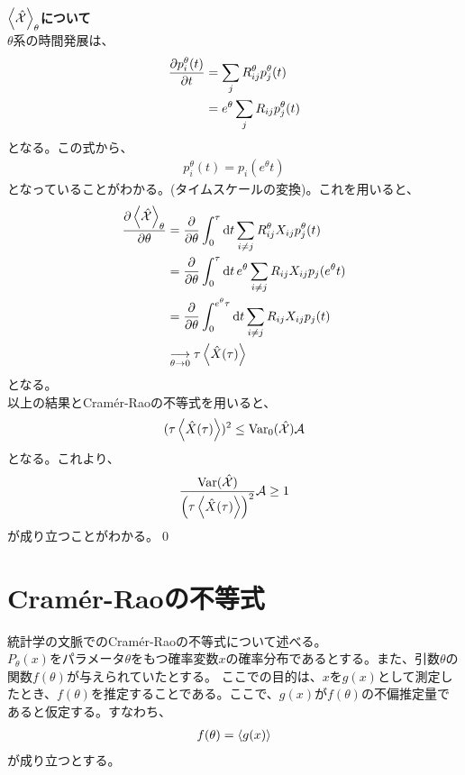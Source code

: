 \documentclass[a4paper,11pt]{jsarticle}
\numberwithin{equation}{section}
\begin{document}
\textbf{$\ev{\hat{\mathcal{X}}}_{\theta}$について}\\
$\theta$系の時間発展は、
\begin{align}
    \pdv{p_i^{\theta}(t)}{t} &= \sum_{j} R_{ij}^{\theta}p_j^{\theta} (t)\\
    &= e^{\theta} \sum_{j} R_{ij}p_j^{\theta} (t)
\end{align}
となる。この式から、
\begin{align}
    p_i^{\theta}(t) = p_i(e^{\theta}t)
\end{align}
となっていることがわかる。(タイムスケールの変換)。これを用いると、
\begin{align}
    \pdv{\ev{\hat{\mathcal{X}}}_{\theta}}{\theta} &= \pdv{\theta}\int_{0}^{\tau} \dd{t} \sum_{i \neq j} R_{ij}^{\theta} X_{ij}p_j^{\theta}(t)\\
    &= \pdv{\theta}\int_{0}^{\tau} \dd{t} e^{\theta} \sum_{i \neq j} R_{ij} X_{ij}p_j(e^{\theta}t)\\
    &= \pdv{\theta}\int_{0}^{e^{\theta}\tau} \dd{t} \sum_{i \neq j} R_{ij} X_{ij}p_j(t)\\
    &\underset{\theta \to 0}{\longrightarrow} \tau \ev{\hat{X}(\tau)}
\end{align}
となる。\\
以上の結果とCram\'er-Raoの不等式を用いると、
\begin{align}
    (\tau \ev{\hat{X}(\tau)})^2 \leq \text{Var}_0(\hat{\mathcal{X}}) \mathcal{A}
\end{align}
となる。これより、
\begin{align}
    \frac{\text{Var}(\hat{\mathcal{X}})}{\qty(\tau \ev{\hat{X}(\tau)})^2} \mathcal{A} \geq 1
\end{align}
が成り立つことがわかる。\qed

\section{Cram\'er-Raoの不等式}
統計学の文脈でのCram\'er-Raoの不等式について述べる。\\
$P_{\theta}(x)$をパラメータ$\theta$をもつ確率変数$x$の確率分布であるとする。また、引数$\theta$の関数$f(\theta)$が与えられていたとする。
ここでの目的は、$x$を$g(x)$として測定したとき、$f(\theta)$を推定することである。ここで、$g(x)$が$f(\theta)$の不偏推定量であると仮定する。すなわち、
\begin{align}
    f(\theta) = \ev{g(x)} 
\end{align}
が成り立つとする。
\end{document}
